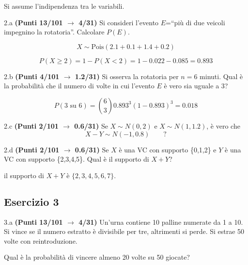 \documentclass[
  11pt,
]{book}
\theoremstyle{mytheoremstyle}
\theoremstyle{mydefstyle}
\newenvironment{sol}
  {
  \begin{tcolorbox}[enhanced,breakable,arc=0.1mm,boxrule=1pt,colback=white,colframe=iblue,
  title=\bf \fontfamily{lmss}\selectfont \hspace{.5 cm} Soluzione,drop fuzzy shadow]

}{
\end{tcolorbox}
  }
\begin{document}
Si assume l'indipendenza tra le variabili.

2.a \textbf{(Punti 13/101 \(\rightarrow\) 4/31)} Si consideri l'evento \(E\)=``più di due veicoli impegnino la rotatoria''. Calcolare \(P(E)\).

\begin{sol}
\[
X\sim\text{Pois}(2.1+0.1+1.4+0.2)
\]

\[P(X\ge 2) = 1-P(X<2)=1-0.022-0.085= 0.893\]

\end{sol}

2.b \textbf{(Punti 4/101 \(\rightarrow\) 1.2/31)} Si osserva la rotatoria per \(n=6\) minuti. Qual è
la probabilità che il numero di volte in cui l'evento \(E\) è vero sia uguale a 3?

\begin{sol}
\[
P(\text{3 su 6})=\binom{6}{3}0.893^3(1-0.893)^3=0.018
\]

\end{sol}

2.c \textbf{(Punti 2/101 \(\rightarrow\) 0.6/31)} Se \(X\sim N(0,2)\) e \(X\sim N(1,1.2)\), è vero che
\[
X-Y\sim N(-1,0.8) \qquad ?
\]

2.d \textbf{(Punti 2/101 \(\rightarrow\) 0.6/31)} Se \(X\) è una VC con supporto \{0,1,2\} e \(Y\) è una VC con supporto \{2,3,4,5\}.
Qual è il supporto di \(X+Y\)?

\begin{sol}
il supporto di \(X+Y\) è \(\{2, 3, 4, 5, 6, 7\}\).

\end{sol}

\subsection{Esercizio 3}\label{esercizio-3-13}

3.a \textbf{(Punti 13/101 \(\rightarrow\) 4/31)} Un'urna contiene 10 palline numerate da 1 a 10.
Si vince se il numero estratto è divisibile per tre, altrimenti si perde.
Si estrae 50 volte con reintroduzione.

Qual è la probabilità di vincere almeno 20 volte su 50 giocate?
\end{document}
